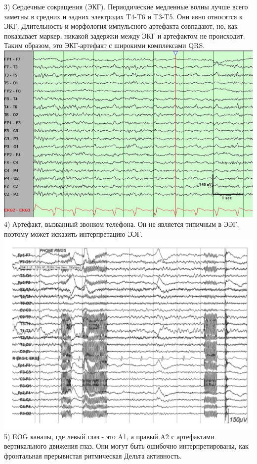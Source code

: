 \documentclass[12pt, a4paper, titlepage]{extreport}
\begin{document}
	3) Сердечные сокращения (ЭКГ). Периодические медленные волны лучше всего заметны в средних и задних электродах  T4-T6 и T3-T5. Они явно относятся к ЭКГ. Длительность и морфология импульсного артефакта совпадают, но, как показывает маркер, никакой задержки между ЭКГ и артефактом не происходит. Таким образом, это ЭКГ-артефакт с широкими комплексами QRS. \\
	\includegraphics[scale=1]{cardiac_artifact.jpg}\\
	4) Артефакт, вызванный звонком телефона. Он не является типичным в ЭЭГ, поэтому может исказить интерпретацию ЭЭГ.\\
	\includegraphics[scale=0.75]{phone_ring}\\
	5) EOG каналы, где левый глаз - это A1, а правый A2 с артефактами вертикального движения глаз. Они могут быть ошибочно интерпретированы, как фронтальная прерывистая ритмическая Дельта активность.\\
\end{document}
